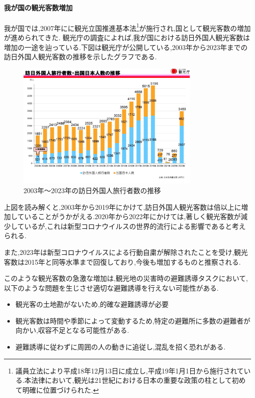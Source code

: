\paragraph{我が国の観光客数増加}
我が国では,2007年にに観光立国推進基本法\footnote{議員立法により平成18年12月13日に成立し,平成19年1月1日から施行されている.本法律において,観光は21世紀における日本の重要な政策の柱として初めて明確に位置づけられた.}が施行され,国として観光客数の増加が進められてきた.
観光庁の調査によれば,我が国における訪日外国人観光客数は増加の一途を辿っている.下図は観光庁が公開している,2003年から2023年までの訪日外国人観光客数の推移を示したグラフである.
\begin{figure}[H] 
  \centering 
  \includegraphics[width=0.8\textwidth]{Figures/001584918.jpg}
  \caption{2003年～2023年の訪日外国人旅行者数の推移} %
  \label{fig:02} 
\end{figure}
上図を読み解くと,2003年から2019年にかけて,訪日外国人観光客数は倍以上に増加していることがうかがえる.2020年から2022年にかけては,著しく観光客数が減少しているが,これは新型コロナウイルスの世界的流行による影響であると考えられる.\par 
また,2023年は新型コロナウイルスによる行動自粛が解除されたことを受け,観光客数は2015年と同等水準まで回復しており,今後も増加するものと推察される.\par 
このような観光客数の急激な増加は,観光地の災害時の避難誘導タスクにおいて,以下のような問題を生じさせ適切な避難誘導を行えない可能性がある.
\begin{itemize}
  \item 観光客の土地勘がないため,的確な避難誘導が必要
  \item 観光客数は時間や季節によって変動するため,特定の避難所に多数の避難者が向かい,収容不足となる可能性がある.
  \item 避難誘導に従わずに周囲の人の動きに追従し,混乱を招く恐れがある.
\end{itemize}


